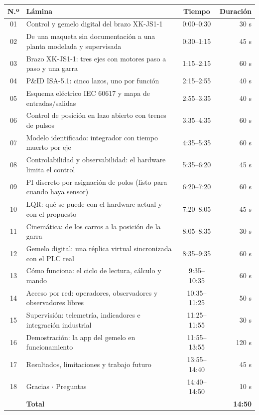 \documentclass[11pt,a4paper]{article}
\begin{document}
\begin{center}\small
\begin{tabularx}{\linewidth}{c X c r}
\toprule
\textbf{N.º} & \textbf{Lámina} & \textbf{Tiempo} & \textbf{Duración}\\
\midrule
01 & Control y gemelo digital del brazo XK-JS1-1 & 0:00--0:30 & 30 s\\
02 & De una maqueta sin documentación a una planta modelada y supervisada & 0:30--1:15 & 45 s\\
03 & Brazo XK-JS1-1: tres ejes con motores paso a paso y una garra & 1:15--2:15 & 60 s\\
04 & P\&ID ISA-5.1: cinco lazos, uno por función & 2:15--2:55 & 40 s\\
05 & Esquema eléctrico IEC 60617 y mapa de entradas/salidas & 2:55--3:35 & 40 s\\
06 & Control de posición en lazo abierto con trenes de pulsos & 3:35--4:35 & 60 s\\
07 & Modelo identificado: integrador con tiempo muerto por eje & 4:35--5:35 & 60 s\\
08 & Controlabilidad y observabilidad: el hardware limita el control & 5:35--6:20 & 45 s\\
09 & PI discreto por asignación de polos (listo para cuando haya sensor) & 6:20--7:20 & 60 s\\
10 & LQR: qué se puede con el hardware actual y con el propuesto & 7:20--8:05 & 45 s\\
11 & Cinemática: de los carros a la posición de la garra & 8:05--8:35 & 30 s\\
12 & Gemelo digital: una réplica virtual sincronizada con el PLC real & 8:35--9:35 & 60 s\\
13 & Cómo funciona: el ciclo de lectura, cálculo y mando & 9:35--10:35 & 60 s\\
14 & Acceso por red: operadores, observadores y observadores libres & 10:35--11:25 & 50 s\\
15 & Supervisión: telemetría, indicadores e integración industrial & 11:25--11:55 & 30 s\\
16 & Demostración: la app del gemelo en funcionamiento & 11:55--13:55 & 120 s\\
17 & Resultados, limitaciones y trabajo futuro & 13:55--14:40 & 45 s\\
18 & Gracias $\cdot$ Preguntas & 14:40--14:50 & 10 s\\
\midrule
 & \textbf{Total} & & \textbf{14:50}\\
\bottomrule
\end{tabularx}
\end{center}
\end{document}
